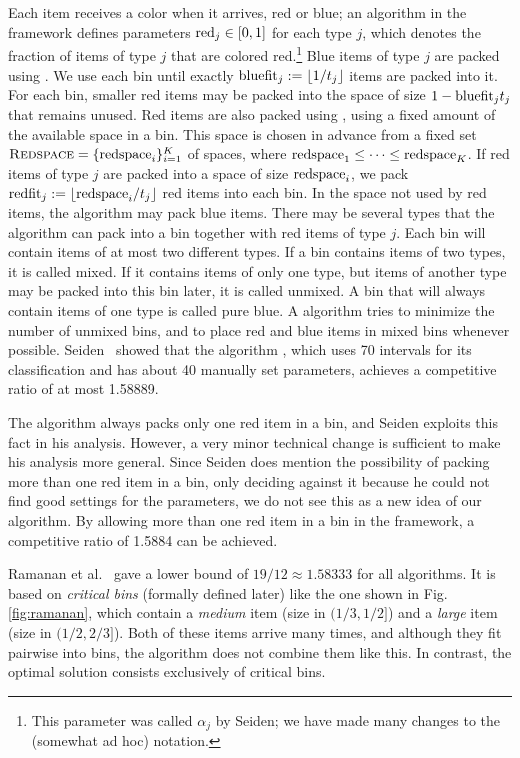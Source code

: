 Each item receives a color when it arrives, red or blue; an algorithm in the {\SuperH} framework defines parameters $\mathrm{red}_j \in [0,1]$ for each type $j$, which denotes the fraction of items of type $j$ that are colored red.\footnote{This parameter was called $\alpha_j$ by Seiden; we have made many changes to the (somewhat ad hoc) notation.}
Blue items of type $j$ are packed using \nf{}. We use each bin until 
exactly $\mathrm{bluefit}_j := \lfloor 1/t_j \rfloor$ items are packed into it.
For each bin, smaller red items may be packed into the space 
of size $1-\mathrm{bluefit}_jt_{j}$ that remains unused. 
Red items are also packed using \nf{}, using a fixed amount of the available space in a bin. 
This space is chosen in advance from a fixed set $\mbox{\textsc{Redspace}}=\{\mathrm{redspace}_i\}_{i=1}^K$ of spaces, where $\mathrm{redspace}_1\le\dots\le\mathrm{redspace}_K$. 
If red items of type $j$ are packed into a space of size $\mathrm{redspace}_i$, we pack $\mathrm{redfit}_j:=\lfloor \mathrm{redspace}_i/t_j\rfloor$ red items into each bin.
In the space not used by red items, the algorithm may pack blue items.
There may be several types that the algorithm can pack into a bin together with red items of type $j$.
Each bin will contain items of at most two different types.
If a bin contains items of two types, it is called mixed. If it contains items of only one type, but items of another type may be packed into this bin later, it is called unmixed. 
A bin that will always contain items of one type is called pure blue. A {\SuperH} algorithm tries to minimize the number of unmixed bins,
and to place red and blue items in mixed bins whenever possible. 
Seiden~\cite{Seiden02} showed that the {\SuperH} algorithm {\Hpp}, which uses 70
intervals for its classification and has about 40 manually set
parameters, achieves a competitive ratio of at most 1.58889.

The algorithm {\Hpp} always packs only one red item in a bin, and Seiden exploits this fact in his analysis. However, a very minor technical change is sufficient to make his analysis more general. Since Seiden does mention the possibility of packing more than one red item in a bin, only deciding against it because he could not find good settings for the parameters, we do not see this as a new idea of our algorithm. By allowing more than one red item in a bin in the {\SuperH} framework, a competitive ratio of 1.5884 can be achieved.

Ramanan et al.~\cite{RaBrLL89} gave a lower bound of $19/12\approx1.58333$
for all {\SuperH} algorithms.
It is based on \emph{critical bins} (formally defined later) like the one shown in
Fig. \ref{fig:ramanan}, which contain a \emph{medium} item (size in $(1/3,1/2]$) and
a \emph{large} item (size in $(1/2,2/3]$). 
Both of these items arrive many times, and although they fit pairwise
into bins, the algorithm does not combine them like this. 
In contrast, the optimal solution consists exclusively of critical bins.


